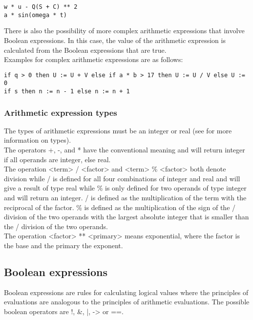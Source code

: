 \documentclass{article}
\begin{document}
\begin{lstlisting}[language={[60]algol}]
w * u - Q(S + C) ** 2
a * sin(omega * t)
\end{lstlisting}

There is also the possibility of more complex arithmetic expressions that involve Boolean expressions. In this case, the value of the arithmetic expression is calculated from the Boolean expressions that are true.\\

Examples for complex arithmetic expressions are as follows:\\

\begin{lstlisting}[language={[60]algol}]
if q > 0 then U := U + V else if a * b > 17 then U := U / V else U := 0
if s then n := n - 1 else n := n + 1
\end{lstlisting}

\subsubsection{Arithmetic expression types} \label{arithexptypes}
The types of arithmetic expressions must be an integer or real (see  for more information on types).\\
The operators +, -, and * have the conventional meaning and will return integer if all operands are integer, else real.\\
The operation <term> / <factor> and <term> \% <factor> both denote division while / is defined for all four combinations of integer and real and will give a result of type real while \% is only defined for two operands of type integer and will return an integer. / is defined as the multiplication of the term with the reciprocal of the factor. \% is defined as the multiplication of the sign of the / division of the two operands with the largest absolute integer that is smaller than the / division of the two operands.\\
The operation <factor> ** <primary> means exponential, where the factor is the base and the primary the exponent.

\subsection{Boolean expressions}
Boolean expressions are rules for calculating logical values where the principles of evaluations are analogous to the principles of arithmetic evaluations. The possible boolean operators are !, \&, |, -\textgreater{} or ==. 
\end{document}
